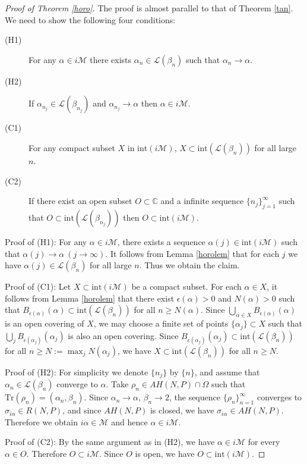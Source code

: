 \documentclass[12pt]{article}
\theoremstyle{plain}
\theoremstyle{definition}
\theoremstyle{remark}
\newcommand{\C}{\mathbb C}
\newcommand{\M}{\mathcal M}
\newcommand{\LL}{\mathcal L}
\newcommand{\alp}{\alpha}
\newcommand{\fty}{\infty}
\newcommand{\ep}{\epsilon}
\newcommand{\Tr}{{\mathrm{Tr}}}
\newcommand{\inte}{\mathrm{int}}
\begin{document}
\begin{proof}[Proof of Theorem \ref{horo}]
The proof is almost parallel to that of Theorem \ref{tan}. 
We need to show the following four conditions: 
%
\begin{description}
\item[(H1)] 
For any $\alpha \in i  \M$ there exists $\alpha_n \in \LL(\beta_n)$ such that 
$\alpha_n \to \alpha$. 
\item[(H2)] If $\alpha_{n_j} \in \LL(\beta_{n_j})$ and $\alpha_{n_j} \to \alpha$ then 
$\alpha \in i\M$. 
\item[(C1)] For any compact subset 
$X$ in $\inte(i \M)$, $X \subset \inte(\LL(\beta_n))$ for all large $n$. 
\item[(C2)] 
If there exist an open subset $O \subset \C$ 
and a infinite sequence $\{n_j\}_{j=1}^\fty$ such that 
$O \subset \inte(\LL(\beta_{n_j}))$ then 
$O \subset \inte(i\M)$. 
\end{description}

Proof of  (H1):  
For any $\alp \in i\M$,  there exists a sequence $\alp(j) \in \inte(i\M)$ 
such that $\alp(j) \to \alp \ (j \to \fty)$. 
It follows from Lemma \ref{horolem} that for each $j$ we have $\alp(j) \in \LL(\beta_n)$ for all large $n$. 
Thus we obtain the claim. 

Proof of  (C1): 
Let $X \subset \inte(i \M)$ be a compact subset. 
For each $\alp \in X$, it follows from Lemma \ref{horolem} that there exist $\ep(\alp)>0$ and 
$N(\alp)>0$ such that $B_{\ep(\alp)}(\alp) \subset \inte(\LL(\beta_n))$ 
for all $n \ge N(\alp)$. Since 
$\bigcup_{\alp \in X} B_{\ep(\alp)}(\alp)$ is an open covering of $X$, 
we may choose a finite set of points $\{\alp_j\} \subset  X$ such that 
$\bigcup_{j} B_{\ep(\alp_j)}(\alp_j)$ is also an open covering.  
Since $B_{\ep(\alp_j)}(\alp_j) \subset \inte(\LL(\beta_n))$ for all 
$n \ge N:=\max_j{N(\alp_j)}$, we have 
$X \subset \inte(\LL(\beta_n))$ for all $n \ge N$. 


Proof of  (H2): 
For simplicity we denote $\{n_j\}$ by $\{n\}$,  and assume that 
$\alpha_{n} \in \LL(\beta_{n})$ converge to $\alpha$. 
Take $\rho_n \in AH(N,P) \cap \Omega$ such that $\Tr(\rho_n)=(\alp_n,\beta_n)$. 
Since $\alp_n \to \alp$, $\beta_n \to 2$,  
the sequence $\{\rho_n\}_{n=1}^\fty$ 
converges to  $\sigma_{i\alp} \in R(N,P)$,  and 
since $AH(N,P)$ is closed, we have $\sigma_{i\alp} \in AH(N,P)$.  
Therefore we obtain $i\alp \in \M$ and hence $\alp \in i\M$. 


Proof of  (C2): 
By the same argument as in (H2), we have $\alp \in i\M$ for every $\alp \in O$. 
Therefore  $O \subset  i\M$. 
Since $O$ is open, we have $O \subset  \inte(i\M)$. 
\end{proof}
\end{document}
